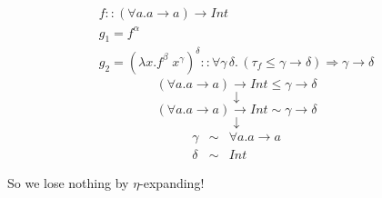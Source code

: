 \documentclass[12pt]{article}
\begin{document}
$$\begin{array}{l}
f :: \left( \forall a. a \to a \right) \to Int \\
g_1 = f^\alpha \\
g_2 = \left( \lambda x. f^\beta \; x^\gamma \right)^\delta :: \forall \gamma \, \delta. \, \left( \tau_f \leq \gamma \to \delta \right) \Rightarrow \gamma \to \delta
\end{array}$$
$$\left( \forall a. a \to a \right) \to Int \leq \gamma \to \delta$$
$$\downarrow$$
$$\left( \forall a. a \to a \right) \to Int \sim \gamma \to \delta$$
$$\downarrow$$
$$\begin{array}{rcl}
\gamma & \sim & \forall a. a \to a \\
\delta & \sim & Int
\end{array}$$
\begin{center} So we lose nothing by $\eta$-expanding! \end{center}
\end{document}
